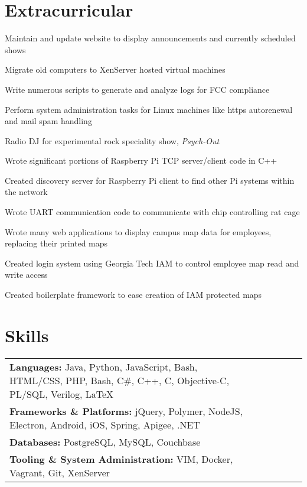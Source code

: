 \documentclass[line]{resume}
\begin{document}
\section{Extracurricular}
\begin{myitemize}
	\item Maintain and update website to display announcements and currently scheduled shows 
	\item Migrate old computers to XenServer hosted virtual machines
	\item Write numerous scripts to generate and analyze logs for FCC compliance
	\item Perform system administration tasks for Linux machines like https autorenewal and mail spam handling
	\item Radio DJ for experimental rock speciality show, \textit{Psych-Out} 
\end{myitemize}

\begin{myitemize}
	\item Wrote significant portions of Raspberry Pi TCP server/client code in C++ 
	\item Created discovery server for Raspberry Pi client to find other Pi systems within the network 
	\item Wrote UART communication code to communicate with chip controlling rat cage 
\end{myitemize}

\begin{myitemize}
	\item Wrote many web applications to display campus map data for employees, replacing their printed maps
	\item Created login system using Georgia Tech IAM to control employee map read and write access 
	\item Created boilerplate framework to ease creation of IAM protected maps 
\end{myitemize}
\section{Skills}
\begin{tabular}{l l l l l l}
	\textbf{Languages:} Java, Python, JavaScript, Bash, HTML/CSS, PHP, Bash, C\#, C++, C, Objective-C, PL/SQL, Verilog, \LaTeX \\
	\textbf{Frameworks \& Platforms:} jQuery, Polymer, NodeJS, Electron, Android, iOS, Spring, Apigee, .NET \\
	\textbf{Databases:} PostgreSQL, MySQL, Couchbase \\
	\textbf{Tooling \& System Administration:}  VIM, Docker, Vagrant, Git, XenServer \\
\end{tabular}
\end{document}
